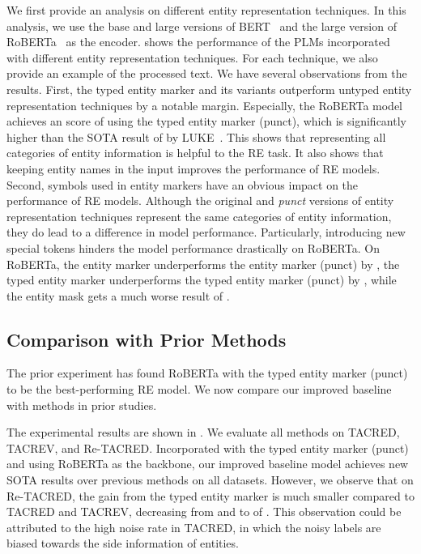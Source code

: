 \documentclass[11pt,a4paper]{article}
\begin{document}
We first provide an analysis on different entity representation techniques. In this analysis, we use the base and large versions of BERT~\cite{devlin-etal-2019-bert} and the large version of RoBERTa~\cite{liu2019roberta} as the encoder.
 shows the performance of the PLMs incorporated with different entity representation techniques.
For each technique, we also provide an example of the processed text.
We have several observations from the results.
First, the typed entity marker and its variants outperform untyped entity representation techniques by a notable margin.
Especially, the RoBERTa model achieves an  score of  using the typed entity marker (punct), which is significantly higher than the SOTA result of  by LUKE~\cite{yamada-etal-2020-luke}.
This shows that representing all categories of entity information is helpful to the RE task.
It also shows that keeping entity names in the input improves the performance of RE models.
Second, symbols used in entity markers have an obvious impact on the performance of RE models.
Although the original and \emph{punct} versions of entity representation techniques represent the same categories of entity information, they do lead to a difference in model performance.
Particularly, introducing new special tokens hinders the model performance drastically on RoBERTa.
On RoBERTa, the entity marker underperforms the entity marker (punct) by , the typed entity marker underperforms the typed entity marker (punct) by , while the entity mask gets a much worse result of .



\subsection{Comparison with Prior Methods}\label{ssec:main}

The prior experiment has found RoBERTa with the typed entity marker (punct) to be the best-performing RE model.
We now compare our improved baseline with methods in prior studies.

The experimental results are shown in .
We evaluate all methods on TACRED, TACREV, and Re-TACRED.
Incorporated with the typed entity marker (punct) and using RoBERTa as the backbone, our improved baseline model achieves new SOTA results over previous methods on all datasets.
However, we observe that on Re-TACRED, the gain from the typed entity marker is much smaller compared to TACRED and TACREV, decreasing from  and  to  of .
This observation could be attributed to the high noise rate in TACRED, in which the noisy labels are biased towards the side information of entities.
\end{document}
